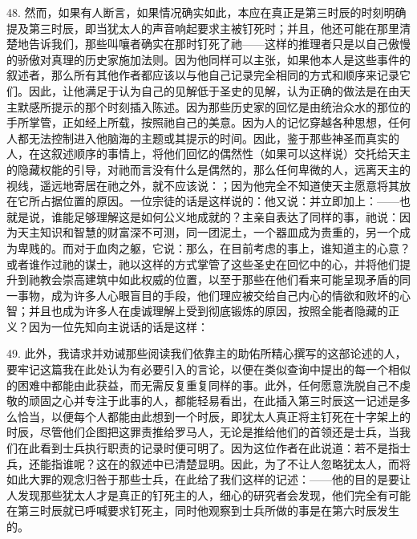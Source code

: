 48. 然而，如果有人断言，如果情况确实如此，本应在真正是第三时辰的时刻明确提及第三时辰，即当犹太人的声音响起要求主被钉死时；并且，他还可能在那里清楚地告诉我们，那些叫嚷者确实在那时钉死了祂——这样的推理者只是以自己傲慢的骄傲对真理的历史家施加法则。因为他同样可以主张，如果他本人是这些事件的叙述者，那么所有其他作者都应该以与他自己记录完全相同的方式和顺序来记录它们。因此，让他满足于认为自己的见解低于圣史的见解，认为正确的做法是在由天主默感所提示的那个时刻插入陈述。因为那些历史家的回忆是由统治众水的那位的手所掌管，正如经上所载，按照祂自己的美意。因为人的记忆穿越各种思想，任何人都无法控制进入他脑海的主题或其提示的时间。因此，鉴于那些神圣而真实的人，在这叙述顺序的事情上，将他们回忆的偶然性（如果可以这样说）交托给天主的隐藏权能的引导，对祂而言没有什么是偶然的，那么任何卑微的人，远离天主的视线，遥远地寄居在祂之外，就不应该说：；因为他完全不知道使天主愿意将其放在它所占据位置的原因。一位宗徒的话是这样说的：他又说：并立即加上：——也就是说，谁能足够理解这是如何公义地成就的？主亲自表达了同样的事，祂说：因为天主知识和智慧的财富深不可测，同一团泥土，一个器皿成为贵重的，另一个成为卑贱的。而对于血肉之躯，它说：那么，在目前考虑的事上，谁知道主的心意？或者谁作过祂的谋士，祂以这样的方式掌管了这些圣史在回忆中的心，并将他们提升到祂教会崇高建筑中如此权威的位置，以至于那些在他们看来可能呈现矛盾的同一事物，成为许多人心眼盲目的手段，他们理应被交给自己内心的情欲和败坏的心智；并且也成为许多人在虔诚理解上受到彻底锻炼的原因，按照全能者隐藏的正义？因为一位先知向主说话的话是这样：\par

49. 此外，我请求并劝诫那些阅读我们依靠主的助佑所精心撰写的这部论述的人，要牢记这篇我在此处认为有必要引入的言论，以便在类似查询中提出的每一个相似的困难中都能由此获益，而无需反复重复同样的事。此外，任何愿意洗脱自己不虔敬的顽固之心并专注于此事的人，都能轻易看出，在此插入第三时辰这一记述是多么恰当，以便每个人都能由此想到一个时辰，即犹太人真正将主钉死在十字架上的时辰，尽管他们企图把这罪责推给罗马人，无论是推给他们的首领还是士兵，当我们在此看到士兵执行职责的记录时便可明了。因为这位作者在此说道：若不是指士兵，还能指谁呢？这在的叙述中已清楚显明。因此，为了不让人忽略犹太人，而将如此大罪的观念归咎于那些士兵，在此给了我们这样的记述：——他的目的是要让人发现那些犹太人才是真正的钉死主的人，细心的研究者会发现，他们完全有可能在第三时辰就已呼喊要求钉死主，同时他观察到士兵所做的事是在第六时辰发生的。\par

